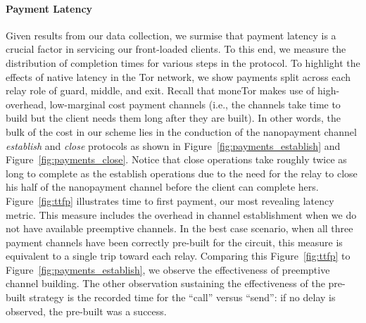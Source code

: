 

\paragraph*{Payment Latency}
Given results from our data collection, we surmise that payment latency is a
crucial factor in servicing our front-loaded clients. To this end, we measure
the distribution of completion times for various steps in the protocol. To
highlight the effects of native latency in the Tor network, we show payments
split across each relay role of guard, middle, and exit. Recall that moneTor
makes use of high-overhead, low-marginal cost payment channels (i.e., the
channels take time to build but the client needs them long after they are
built). In other words, the bulk of the cost in our scheme lies in the
conduction of the nanopayment channel \emph{establish} and \emph{close}
protocols as shown in Figure~\ref{fig:payments_establish} and
Figure~\ref{fig:payments_close}. Notice that close operations take roughly twice
as long to complete as the establish operations due to the need for the relay to
close his half of the nanopayment channel before the client can complete hers.
Figure~\ref{fig:ttfp} illustrates time to first payment, our most revealing
latency metric. This measure includes the overhead in channel establishment when
we do not have available preemptive channels. In the best case scenario, when
all three payment channels have been correctly pre-built for the circuit, this
measure is equivalent to a single trip toward each relay. Comparing this
Figure~\ref{fig:ttfp} to Figure~\ref{fig:payments_establish}, we observe the
effectiveness of preemptive channel building. The other observation sustaining
the effectiveness of the pre-built strategy is the recorded time for the
``call'' versus ``send'': if no delay is observed, the pre-built was a success.

